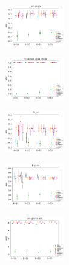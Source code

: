 
\begin{subfigure}
     \centering
         \includegraphics[width=0.23\textwidth]{fig2/astro-ph_wsim_evo2__}
\end{subfigure}
\begin{subfigure}
         \centering
      \includegraphics[width=0.23\textwidth]{fig2/digg-reply_wsim_evo2__}               
\end{subfigure}                                                                          
\begin{subfigure}                                                                        
         \centering                                                                      
      \includegraphics[width=0.23\textwidth]{fig2/fb_uc_wsim_evo2__}
\end{subfigure}                                                                          
\begin{subfigure}                                                                        
         \centering                                                                      
      \includegraphics[width=0.23\textwidth]{fig2/hep-th_wsim_evo2__}
\end{subfigure}                                                                          
\begin{subfigure}
         \centering
      \includegraphics[width=0.23\textwidth]{fig2/prosper-loans_wsim_evo2__}
\end{subfigure}                                                             
